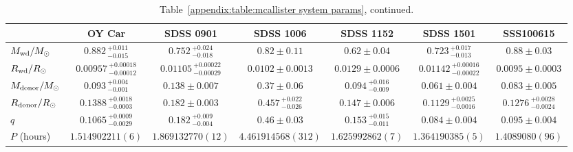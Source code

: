 \begin{landscape}
    \begin{table*}
        \centering
        \caption{Table~\ref{appendix:table:mcallister system params}, continued.}
        \label{appendix:table:mcallister system params cont 1}
        \begin{tabular}{lcccccc}
            \hline
            ~                           & \textbf{OY Car}                   & \textbf{SDSS 0901}                    & \textbf{SDSS 1006}            & \textbf{SDSS 1152}            & \textbf{SDSS 1501}                                        & \textbf{SSS100615}                \\
            \hline
            \hline
            $M_{\rm wd}/M_{\odot}$      & $0.882\,^{+0.011}_{-0.015}$       & $0.752\,^{+0.024}_{-0.018}$           & $0.82\pm0.11$                 & $0.62\pm0.04$                 & $0.723\,^{+0.017}_{-0.013}$                               & $0.88\pm0.03$                     \\
            $R_{\rm wd}/R_{\odot}$      & $0.00957\,^{+0.00018}_{-0.00012}$ & $0.01105\,^{+0.00022}_{-0.00029}$     & $0.0102\pm0.0013$             & $0.0129\pm0.0006$             & $0.01142\,^{+0.00016}_{-0.00022}$                         & $0.0095\pm0.0003$                 \\
            $M_{\rm donor}/M_{\odot}$   & $0.093\,^{+0.004}_{-0.001}$       & $0.138\pm0.007$                       & $0.37\pm0.06$                 & $0.094\,^{+0.016}_{-0.009}$   & $0.061\pm0.004$                                           & $0.083\pm0.005$                   \\
            $R_{\rm donor}/R_{\odot}$   & $0.1388\,^{+0.0018}_{-0.0003}$    & $0.182\pm0.003$                       & $0.457\,^{+0.022}_{-0.026}$   & $0.147\pm0.006$               & $0.1129\,^{+0.0025}_{-0.0016}$                            & $0.1276\,^{+0.0028}_{-0.0024}$    \\
            $q$                         & $0.1065\,^{+0.0009}_{-0.0029}$    & $0.182\,^{+0.009}_{-0.004}$           & $0.46\pm0.03$                 & $0.153\,^{+0.015}_{-0.011}$   & $0.084\pm0.004$                                           & $0.095\pm0.004$                   \\
            \hline
            $P$ (hours)                  & $1.514902211(6)$                  & $1.869132770(12)$                     & $4.461914568(312)$            & $1.625992862(7)$              & $1.364190385(5)$                                          & $1.4089080(96)$                   \\

\end{tabular}
\end{table*}
\end{landscape}
